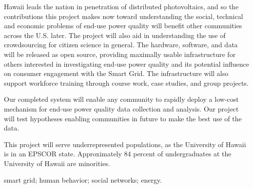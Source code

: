 
Hawaii leads the nation in penetration of distributed photovoltaics, and so the contributions this project makes now toward understanding the social, technical and economic problems of end-use power quality will benefit other communities across the U.S. later. The project will also aid in understanding the use of crowdsourcing for citizen science in general.  The hardware, software, and data will be released as open source, providing maximally usable infrastructure for others interested in investigating end-use power quality and its potential influence on consumer engagement with the Smart Grid.  The infrastructure will also support workforce training through course work, case studies, and group projects.

Our completed system will enable any community to rapidly deploy a low-cost mechanism for end-use power quality data collection and analysis. Our project will test hypotheses enabling communities in future to make the best use of the data.

This project will serve underrepresented populations, as the University of Hawaii is in an EPSCOR state. Approximately 84 percent of undergraduates at the University of Hawaii are minorities. 

\medskip

 smart grid; human behavior; social networks;
energy.




